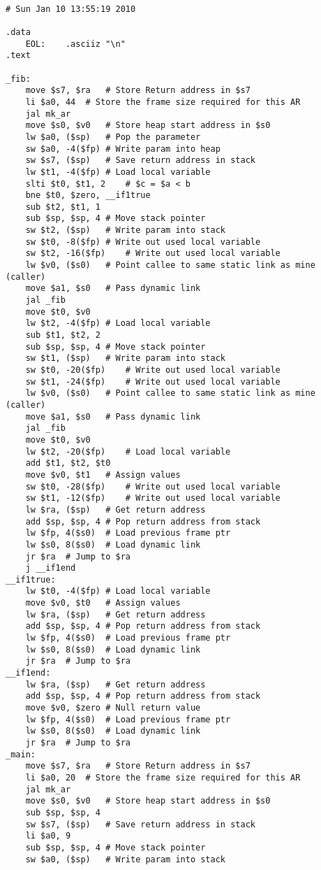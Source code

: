 \begin{lstlisting}[showstringspaces=false,breaklines=true,backgroundcolor=\color{light-gray}, captionpos=b]
         
# Sun Jan 10 13:55:19 2010

.data
	EOL:	.asciiz "\n"
.text

_fib:
	move $s7, $ra	# Store Return address in $s7
	li $a0, 44	# Store the frame size required for this AR
	jal mk_ar
	move $s0, $v0	# Store heap start address in $s0
	lw $a0, ($sp)	# Pop the parameter
	sw $a0, -4($fp)	# Write param into heap
	sw $s7, ($sp)	# Save return address in stack
	lw $t1, -4($fp)	# Load local variable
	slti $t0, $t1, 2	# $c = $a < b
	bne $t0, $zero, __if1true
	sub $t2, $t1, 1
	sub $sp, $sp, 4	# Move stack pointer
	sw $t2, ($sp)	# Write param into stack
	sw $t0, -8($fp)	# Write out used local variable
	sw $t2, -16($fp)	# Write out used local variable
	lw $v0, ($s0)	# Point callee to same static link as mine (caller)
	move $a1, $s0	# Pass dynamic link
	jal _fib
	move $t0, $v0
	lw $t2, -4($fp)	# Load local variable
	sub $t1, $t2, 2
	sub $sp, $sp, 4	# Move stack pointer
	sw $t1, ($sp)	# Write param into stack
	sw $t0, -20($fp)	# Write out used local variable
	sw $t1, -24($fp)	# Write out used local variable
	lw $v0, ($s0)	# Point callee to same static link as mine (caller)
	move $a1, $s0	# Pass dynamic link
	jal _fib
	move $t0, $v0
	lw $t2, -20($fp)	# Load local variable
	add $t1, $t2, $t0
	move $v0, $t1	# Assign values
	sw $t0, -28($fp)	# Write out used local variable
	sw $t1, -12($fp)	# Write out used local variable
	lw $ra, ($sp)	# Get return address
	add $sp, $sp, 4	# Pop return address from stack
	lw $fp, 4($s0)	# Load previous frame ptr
	lw $s0, 8($s0)	# Load dynamic link
	jr $ra	# Jump to $ra
	j __if1end
__if1true:
	lw $t0, -4($fp)	# Load local variable
	move $v0, $t0	# Assign values
	lw $ra, ($sp)	# Get return address
	add $sp, $sp, 4	# Pop return address from stack
	lw $fp, 4($s0)	# Load previous frame ptr
	lw $s0, 8($s0)	# Load dynamic link
	jr $ra	# Jump to $ra
__if1end:
	lw $ra, ($sp)	# Get return address
	add $sp, $sp, 4	# Pop return address from stack
	move $v0, $zero	# Null return value
	lw $fp, 4($s0)	# Load previous frame ptr
	lw $s0, 8($s0)	# Load dynamic link
	jr $ra	# Jump to $ra
_main:
	move $s7, $ra	# Store Return address in $s7
	li $a0, 20	# Store the frame size required for this AR
	jal mk_ar
	move $s0, $v0	# Store heap start address in $s0
	sub $sp, $sp, 4
	sw $s7, ($sp)	# Save return address in stack
	li $a0, 9
	sub $sp, $sp, 4	# Move stack pointer
	sw $a0, ($sp)	# Write param into stack

\end{lstlisting}
